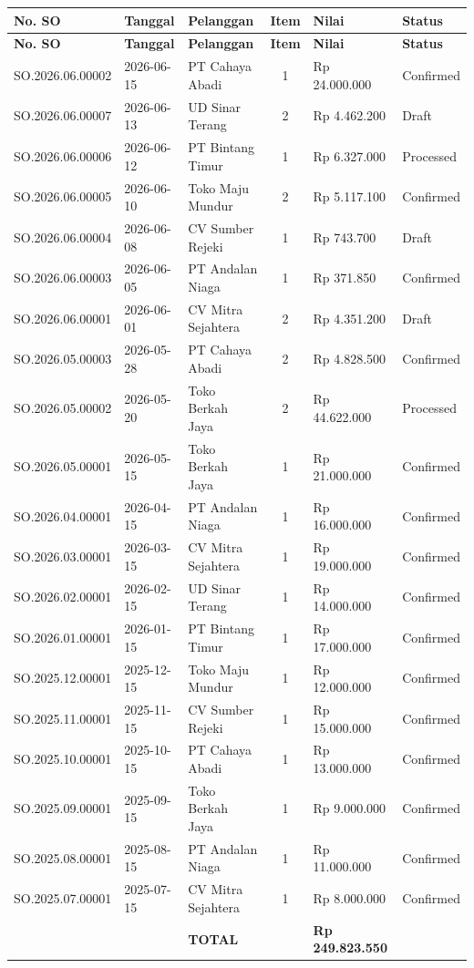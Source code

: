 \documentclass[11pt,a4paper]{article}
\begin{document}
{\setlength{\tabcolsep}{5pt}\small
\begin{longtable}{l l p{4cm} c R{2.6cm} l}
\toprule
\textbf{No. SO} & \textbf{Tanggal} & \textbf{Pelanggan} & \textbf{Item} & \textbf{Nilai} & \textbf{Status} \\
\midrule\endfirsthead
\toprule
\textbf{No. SO} & \textbf{Tanggal} & \textbf{Pelanggan} & \textbf{Item} & \textbf{Nilai} & \textbf{Status} \\
\midrule\endhead
\bottomrule\endfoot
SO.2026.06.00002 & 2026-06-15 & PT Cahaya Abadi & 1 & Rp 24.000.000 & Confirmed \\
SO.2026.06.00007 & 2026-06-13 & UD Sinar Terang & 2 & Rp 4.462.200 & Draft \\
SO.2026.06.00006 & 2026-06-12 & PT Bintang Timur & 1 & Rp 6.327.000 & Processed \\
SO.2026.06.00005 & 2026-06-10 & Toko Maju Mundur & 2 & Rp 5.117.100 & Confirmed \\
SO.2026.06.00004 & 2026-06-08 & CV Sumber Rejeki & 1 & Rp 743.700 & Draft \\
SO.2026.06.00003 & 2026-06-05 & PT Andalan Niaga & 1 & Rp 371.850 & Confirmed \\
SO.2026.06.00001 & 2026-06-01 & CV Mitra Sejahtera & 2 & Rp 4.351.200 & Draft \\
SO.2026.05.00003 & 2026-05-28 & PT Cahaya Abadi & 2 & Rp 4.828.500 & Confirmed \\
SO.2026.05.00002 & 2026-05-20 & Toko Berkah Jaya & 2 & Rp 44.622.000 & Processed \\
SO.2026.05.00001 & 2026-05-15 & Toko Berkah Jaya & 1 & Rp 21.000.000 & Confirmed \\
SO.2026.04.00001 & 2026-04-15 & PT Andalan Niaga & 1 & Rp 16.000.000 & Confirmed \\
SO.2026.03.00001 & 2026-03-15 & CV Mitra Sejahtera & 1 & Rp 19.000.000 & Confirmed \\
SO.2026.02.00001 & 2026-02-15 & UD Sinar Terang & 1 & Rp 14.000.000 & Confirmed \\
SO.2026.01.00001 & 2026-01-15 & PT Bintang Timur & 1 & Rp 17.000.000 & Confirmed \\
SO.2025.12.00001 & 2025-12-15 & Toko Maju Mundur & 1 & Rp 12.000.000 & Confirmed \\
SO.2025.11.00001 & 2025-11-15 & CV Sumber Rejeki & 1 & Rp 15.000.000 & Confirmed \\
SO.2025.10.00001 & 2025-10-15 & PT Cahaya Abadi & 1 & Rp 13.000.000 & Confirmed \\
SO.2025.09.00001 & 2025-09-15 & Toko Berkah Jaya & 1 & Rp 9.000.000 & Confirmed \\
SO.2025.08.00001 & 2025-08-15 & PT Andalan Niaga & 1 & Rp 11.000.000 & Confirmed \\
SO.2025.07.00001 & 2025-07-15 & CV Mitra Sejahtera & 1 & Rp 8.000.000 & Confirmed \\
 &  & \textbf{TOTAL} &  & \textbf{Rp 249.823.550} &  \\
\end{longtable}}
\end{document}
